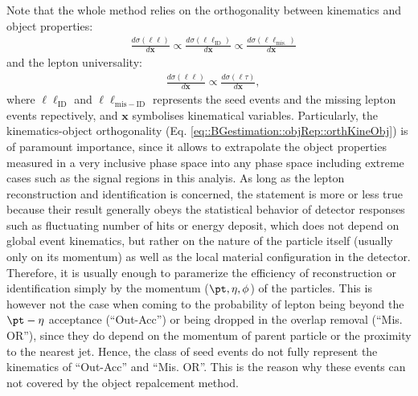 Note that the whole method relies on the orthogonality between kinematics and object properties:
\begin{align}
  & \frac{d\sigma(\ell\ell)}{d\bm{x}}
  \propto \frac{d\sigma(\ell\ell_{\mathrm{ID}})}{d\bm{x}} 
  \propto \frac{d\sigma(\ell\ell_{\mathrm{mis.}})}{d\bm{x}} 
  \label{eq::BGestimation::objRep::orthKineObj}
\end{align}
and the lepton universality:
\begin{align}
  & \frac{d\sigma(\ell\ell)}{d\bm{x}}
  \propto \frac{d\sigma(\ell\tau)}{d\bm{x}},
  \label{eq::BGestimation::objRep::lepUniv}
\end{align}
where $\ell\ell_{\mathrm{ID}}$ and $\ell\ell_{\mathrm{mis-ID}}$ represents the seed events and the missing lepton events repectively, and $\bm{x}$ symbolises kinematical variables. 
Particularly, the kinematics-object orthogonality (Eq. \ref{eq::BGestimation::objRep::orthKineObj}) is of paramount importance, since it allows to extrapolate the object properties measured in a very inclusive phase space into any phase space including extreme cases such as the signal regions in this analyis. As long as the lepton reconstruction and identification is concerned, the statement is more or less true
because their result generally obeys the statistical behavior of detector responses such as fluctuating number of hits or energy deposit, which does not depend on global event kinematics, but rather on the nature of the particle itself (usually only on its momentum) as well as the local material configuration in the detector. Therefore, it is usually enough to paramerize the efficiency of reconstruction or identification simply by the momentum ($\pt, \eta, \phi$) of the particles. This is however not the case when coming to the probability of lepton being beyond the $\pt-\eta$ acceptance (``Out-Acc'') or being dropped in the overlap removal (``Mis. OR''), since they do depend on the momentum of parent particle or the proximity to the nearest jet. Hence, the class of seed events do not fully represent the kinematics of ``Out-Acc'' and ``Mis. OR''. This is the reason why these events can not covered by the object repalcement method. \\

